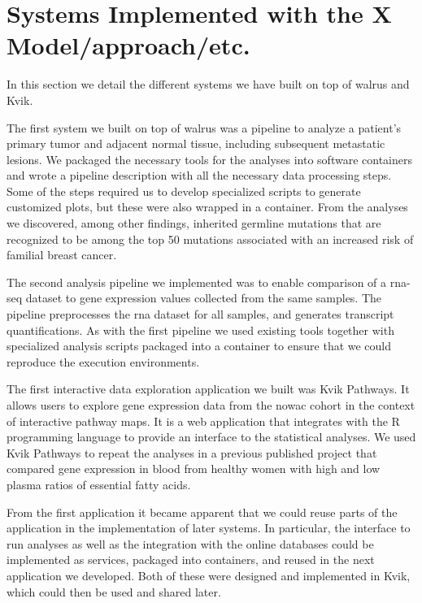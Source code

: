 \section{Systems Implemented with the X Model/approach/etc.} 
In this section we detail the different systems we have built on top of walrus
and Kvik. 

The first system we built on top of walrus was a pipeline to analyze a patient’s
primary tumor and adjacent normal tissue, including subsequent metastatic
lesions.\cite{walrus} We packaged the necessary tools for the analyses into
software containers and wrote a pipeline description with all the necessary data
processing steps. Some of the steps required us to develop specialized scripts
to generate customized plots, but these were also wrapped in a container. From
the analyses we discovered, among other findings, inherited germline mutations
that are recognized to be among the top 50 mutations associated with an
increased risk of familial breast cancer.

The second analysis pipeline we implemented was to enable comparison of a
\gls{rna}-seq dataset to 
gene expression values collected from the same samples.
The pipeline preprocesses the \gls{rna} dataset for all samples, and generates
transcript quantifications. As with the first pipeline we used existing tools
together with specialized analysis scripts packaged into a container to ensure
that we could reproduce the execution environments. 

The first interactive data exploration application we built was Kvik Pathways.
It allows users to explore gene expression data from the \gls{nowac} cohort in
the context of interactive pathway maps.\cite{pathways} It is a web application
that integrates with the R programming language to provide an interface to the
statistical analyses. We used Kvik Pathways to repeat the analyses in a previous
published project that compared gene expression in blood from healthy women with
high and low plasma ratios of essential fatty acids.\cite{olsen2013plasma}

From the first application it became apparent that we could reuse parts of the
application in the implementation of later systems. In particular, the interface
to run analyses as well as the integration with the online databases could be
implemented as services, packaged into containers, and reused in the next
application we developed. Both of these were designed and implemented in Kvik,
which could then be used and shared later. 

